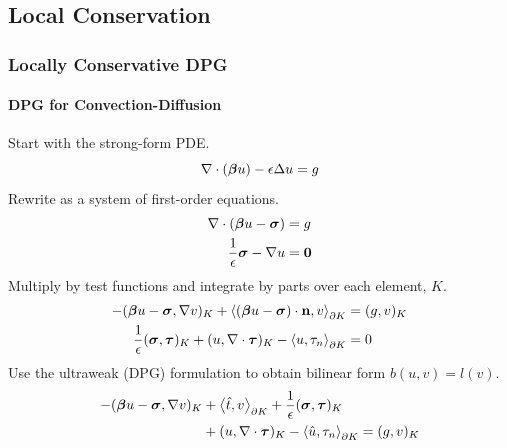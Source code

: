 \documentclass[18pt,xcolor=table]{beamer}
\newcounter{nn}
\begin{document}
\subsection{Local Conservation}
\begin{frame}
\frametitle{Locally Conservative DPG}
\framesubtitle{DPG for Convection-Diffusion}
Start with the strong-form PDE.
\[
\nabla\cdot(\boldsymbol\beta u)-\epsilon\Delta u = g
\]
Rewrite as a system of first-order equations.
\begin{align*}
\nabla\cdot(\boldsymbol\beta u-\boldsymbol\sigma)&=g\\
\frac{1}{\epsilon}\boldsymbol\sigma-\nabla u&=\boldsymbol0
\end{align*}
Multiply by test functions and integrate by parts over each element, $K$.
\begin{align*}
-(\boldsymbol\beta u-\boldsymbol\sigma,\nabla v)_K+\left\langle (\boldsymbol\beta
u-\boldsymbol\sigma)\cdot\mathbf{n},v \right\rangle_{\partial K}&=(g,v)_K\\
\frac{1}{\epsilon}(\boldsymbol\sigma,\boldsymbol\tau)_K+(u,\nabla\cdot\boldsymbol\tau)_K
-\left\langle u,\tau_n \right\rangle_{\partial K}&=0
\end{align*}
Use the ultraweak (DPG) formulation to obtain bilinear form $b(u,v)=l(v)$.
\begin{align*}
-(\boldsymbol\beta u-\boldsymbol\sigma,\nabla v)_K&+\left\langle \hat t,v \right\rangle_{\partial K}
+ \frac{1}{\epsilon}(\boldsymbol\sigma,\boldsymbol\tau)_K\\
&+(u,\nabla\cdot\boldsymbol\tau)_K
-\left\langle \hat u,\tau_n \right\rangle_{\partial K}=(g,v)_K
\end{align*}
\end{frame}

\end{document}
